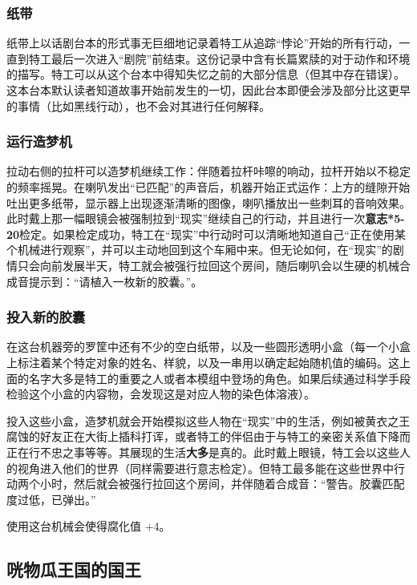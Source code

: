 \subsubsection{纸带}

纸带上以话剧台本的形式事无巨细地记录着特工从追踪“悖论”开始的所有行动，一直到特工最后一次进入“剧院”前结束。这份记录中含有长篇累牍的对于动作和环境的描写。特工可以从这个台本中得知失忆之前的大部分信息（但其中存在错误）。这本台本默认读者知道故事开始前发生的一切，因此台本即便会涉及部分比这更早的事情（比如黑线行动），也不会对其进行任何解释。

\subsubsection{运行造梦机}

拉动右侧的拉杆可以造梦机继续工作：伴随着拉杆咔嚓的响动，拉杆开始以不稳定的频率摇晃。在喇叭发出“已匹配”的声音后，机器开始正式运作：上方的缝隙开始吐出更多纸带，显示器上出现逐渐清晰的图像，喇叭播放出一些刺耳的音响效果。此时戴上那一幅眼镜会被强制拉到“现实”继续自己的行动，并且进行一次\textbf{意志*5-20}检定。如果检定成功，特工在“现实”中行动时可以清晰地知道自己“正在使用某个机械进行观察”，并可以主动地回到这个车厢中来。但无论如何，在“现实”的剧情只会向前发展半天，特工就会被强行拉回这个房间，随后喇叭会以生硬的机械合成音提示到：“请植入一枚新的胶囊。”。

\subsubsection{投入新的胶囊}

在这台机器旁的罗筐中还有不少的空白纸带，以及一些圆形透明小盒（每一个小盒上标注着某个特定对象的姓名、样貌，以及一串用以确定起始随机值的编码。这上面的名字大多是特工的重要之人或者本模组中登场的角色。如果后续通过科学手段检验这个小盒的内容物，会发现这是对应人物的染色体溶液）。

投入这些小盒，造梦机就会开始模拟这些人物在“现实”中的生活，例如被黄衣之王腐蚀的好友正在大街上插科打诨，或者特工的伴侣由于与特工的亲密关系值下降而正在行不忠之事等等。其展现的生活\textbf{大多}是真的。此时戴上眼镜，特工会以这些人的视角进入他们的世界（同样需要进行意志检定）。但特工最多能在这些世界中行动两个小时，然后就会被强行拉回这个房间，并伴随着合成音：“警告。胶囊匹配度过低，已弹出。”

使用这台机械会使得腐化值 +4。

\subsection{咣物瓜王国的国王}

